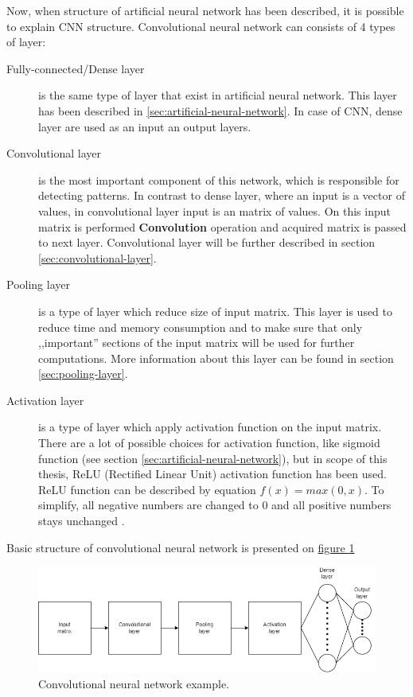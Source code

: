    Now, when structure of artificial neural network has been described, it is possible to explain CNN structure. Convolutional neural network can consists of 4 types of layer:
    \begin{description}
        \item[Fully-connected/Dense layer] is the same type of layer that exist in artificial neural network. This layer has been described in \ref{sec:artificial-neural-network}. In case of CNN, dense layer are used as an input an output layers.
        \item[Convolutional layer] is the most important component of this network, which is responsible for detecting patterns. In contrast to dense layer, where an input is a vector of values, in convolutional layer input is an matrix of values. On this input matrix is performed \textbf{Convolution} operation and acquired matrix is passed to next layer. Convolutional layer will be further described in section \ref{sec:convolutional-layer}.
        \item[Pooling layer] is a type of layer which reduce size of input matrix. This layer is used to reduce time and memory consumption and to make sure that only ,,important'' sections of the input matrix will be used for further computations. More information about this layer can be found in section \ref{sec:pooling-layer}.
        \item[Activation layer] is a type of layer which apply activation function on the input matrix. There are a lot of possible choices for activation function, like sigmoid function (see section \ref{sec:artificial-neural-network}), but in scope of this thesis, ReLU (Rectified Linear Unit) activation function has been used. ReLU function can be described by equation $f(x) = max(0, x)$. To simplify, all negative numbers are changed to $0$ and all positive numbers stays unchanged \cite{bib:internet-relu-function}.
    \end{description}
    Basic structure of convolutional neural network is presented on \hyperref[fig:cnn-example]{figure \ref*{fig:cnn-example}}
    \begin{figure}
        \centering
        \includegraphics[width=\textwidth]{dependencies/pictures/CNN_example.png}
        \caption{Convolutional neural network example.}
        \label{fig:cnn-example}
    \end{figure}

